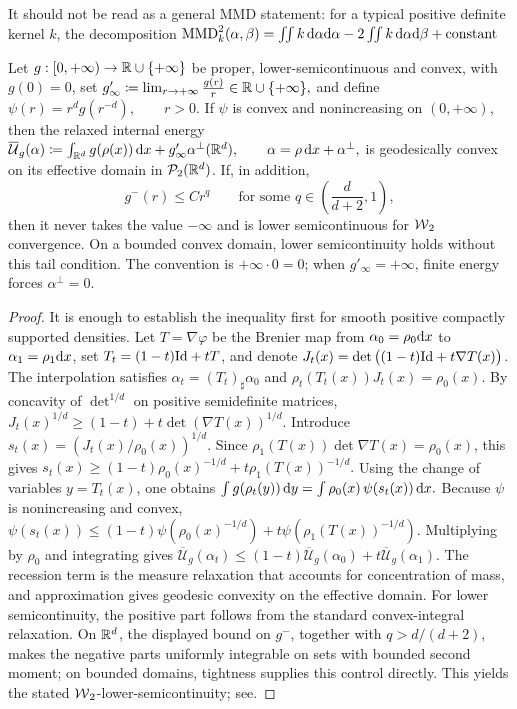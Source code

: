 It should not be read as a general MMD statement: for a typical positive definite kernel \(k\), the decomposition
\(\operatorname{MMD}_k^2(\alpha,\beta) = \iint k\,\mathrm{d}\alpha\mathrm{d}\alpha -2\iint k\,\mathrm{d}\alpha\mathrm{d}\beta +\mathrm{constant}\)
\begin{thm}\label{thm-mccann-internal-energy}
Let \(g:[0,+\infty)\to\mathbb{R}\cup\{+\infty\}\) be proper, lower-semicontinuous and convex, with \(g(0)=0\), set
\(g'_\infty\coloneqq\lim_{r\to+\infty}\frac{g(r)}r\in\mathbb{R}\cup\{+\infty\},\)
and define
\(\psi(r)=r^d g(r^{-d}),\qquad r>0.\)
If \(\psi\) is convex and nonincreasing on \((0,+\infty)\), then the relaxed internal energy
\(\overline{\mathcal U}_g(\alpha) \coloneqq \int_{\mathbb{R}^d}g(\rho(x))\,\mathrm{d} x +g'_\infty\alpha^\perp(\mathbb{R}^d), \qquad \alpha=\rho\,\mathrm{d} x+\alpha^\perp,\)
is geodesically convex on its effective domain in \(\mathcal{P}_2(\mathbb{R}^d)\). If, in addition,
\[
g^-(r)\leq C r^q
\qquad\text{for some }q\in\left(\frac{d}{d+2},1\right),
\]
then it never takes the value \(-\infty\) and is lower semicontinuous for \(\operatorname{\mathcal{W}}_2\) convergence. On a bounded convex domain, lower semicontinuity holds without this tail condition. The convention is \(+\infty\cdot0=0\); when \(g'_\infty=+\infty\), finite energy forces \(\alpha^\perp=0\).
\end{thm}
\begin{proof}
It is enough to establish the inequality first for smooth positive compactly supported densities. Let \(T=\nabla\varphi\) be the Brenier map from \(\alpha_0=\rho_0\mathrm{d} x\) to \(\alpha_1=\rho_1\mathrm{d} x\), set \(T_t=(1-t)\mathrm{Id}+tT\), and denote
\(J_t(x)=\det\big((1-t)\mathrm{Id}+t\nabla T(x)\big)\).
The interpolation satisfies \(\alpha_t=(T_t)_\sharp\alpha_0\) and
\(\rho_t(T_t(x))J_t(x)=\rho_0(x)\).
By concavity of \(\det^{1/d}\) on positive semidefinite matrices, \(J_t(x)^{1/d}\geq (1-t)+t\det(\nabla T(x))^{1/d}.\)
Introduce \(s_t(x)=(J_t(x)/\rho_0(x))^{1/d}\). Since
\(\rho_1(T(x))\det\nabla T(x)=\rho_0(x)\), this gives
\(s_t(x)\geq (1-t)\rho_0(x)^{-1/d}+t\rho_1(T(x))^{-1/d}.\)
Using the change of variables \(y=T_t(x)\), one obtains
\(\int g(\rho_t(y))\,\mathrm{d} y =\int \rho_0(x)\,\psi(s_t(x))\,\mathrm{d} x.\)
Because \(\psi\) is nonincreasing and convex, \(\psi(s_t(x)) \leq (1-t)\psi(\rho_0(x)^{-1/d})+t\psi(\rho_1(T(x))^{-1/d}).\)
Multiplying by \(\rho_0\) and integrating gives
\(\overline{\mathcal U}_g(\alpha_t)\leq(1-t)\overline{\mathcal U}_g(\alpha_0)+t\overline{\mathcal U}_g(\alpha_1)\).
The recession term is the measure relaxation that accounts for concentration of mass, and approximation gives geodesic convexity on the effective domain. For lower semicontinuity, the positive part follows from the standard convex-integral relaxation. On \(\mathbb{R}^d\), the displayed bound on \(g^-\), together with \(q>d/(d+2)\), makes the negative parts uniformly integrable on sets with bounded second moment; on bounded domains, tightness supplies this control directly. This yields the stated \(\operatorname{\mathcal{W}}_2\)-lower-semicontinuity; see.
\end{proof}
